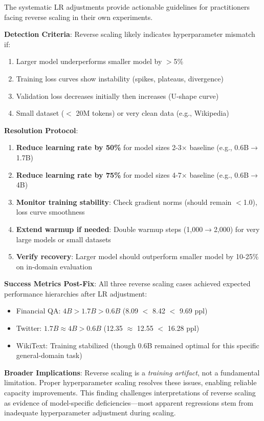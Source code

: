 The systematic LR adjustments provide actionable guidelines for practitioners facing reverse scaling in their own experiments.

\textbf{Detection Criteria}: Reverse scaling likely indicates hyperparameter mismatch if:
\begin{enumerate}
\item Larger model underperforms smaller model by $>$5\%
\item Training loss curves show instability (spikes, plateaus, divergence)
\item Validation loss decreases initially then increases (U-shape curve)
\item Small dataset ($<$ 20M tokens) or very clean data (e.g., Wikipedia)
\end{enumerate}

\textbf{Resolution Protocol}:
\begin{enumerate}
\item \textbf{Reduce learning rate by 50\%} for model sizes 2-3$\times$ baseline (e.g., 0.6B$\to$1.7B)
\item \textbf{Reduce learning rate by 75\%} for model sizes 4-7$\times$ baseline (e.g., 0.6B$\to$4B)
\item \textbf{Monitor training stability}: Check gradient norms (should remain $<$1.0), loss curve smoothness
\item \textbf{Extend warmup if needed}: Double warmup steps (1,000$\to$2,000) for very large models or small datasets
\item \textbf{Verify recovery}: Larger model should outperform smaller model by 10-25\% on in-domain evaluation
\end{enumerate}

\textbf{Success Metrics Post-Fix}: All three reverse scaling cases achieved expected performance hierarchies after LR adjustment:
\begin{itemize}
\item Financial QA: $4B > 1.7B > 0.6B$ (8.09 $<$ 8.42 $<$ 9.69 ppl)
\item Twitter: $1.7B \approx 4B > 0.6B$ (12.35 $\approx$ 12.55 $<$ 16.28 ppl)
\item WikiText: Training stabilized (though 0.6B remained optimal for this specific general-domain task)
\end{itemize}

\textbf{Broader Implications}: Reverse scaling is a \textit{training artifact}, not a fundamental limitation. Proper hyperparameter scaling resolves these issues, enabling reliable capacity improvements. This finding challenges interpretations of reverse scaling as evidence of model-specific deficiencies---most apparent regressions stem from inadequate hyperparameter adjustment during scaling.

